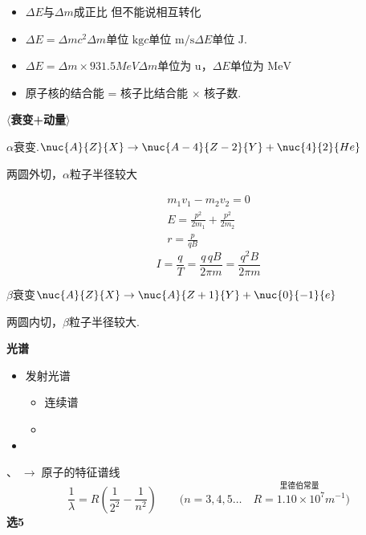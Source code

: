 \begin{itemize}
\item[$\downarrow$] $\Delta E$与$\Delta m$成正比 但不能说相互转化
\item[] $\Delta E=\Delta mc^2$\quad $\Delta m$单位 $\mathrm{kg}$\quad $c$单位 $\mathrm{m/s}$\quad $\Delta E$单位 $\mathrm{J}$.
\item[] $\Delta E=\Delta m\times931.5\unit{MeV}$\quad $\Delta m$单位为 $\mathrm{u}$，$\Delta E$单位为 $\mathrm{MeV}$
\item[] 原子核的结合能 = 核子比结合能 $\times$ 核子数.
\end{itemize}
\textbf{$\langle$衰变+动量$\rangle$} %

\noindent $\alpha$衰变.\quad $\nuc{A}{Z}{X}\to\nuc{A-4}{Z-2}{Y}+\nuc{4}{2}{He}$\quad {} %

两圆外切，$\alpha$粒子半径较大

\begin{gather*}
m_1v_1-m_2v_2=0\\
E=\frac{p^2}{2m_1}+\frac{p^2}{2m_2}\\
r=\frac{p}{qB}
\end{gather*}
\[
I=\frac{q}{T}=\frac{q\,qB}{2\pi m}=\frac{q^2B}{2\pi m}
\]

\noindent $\beta$衰变\quad $\nuc{A}{Z}{X}\to\nuc{A}{Z+1}{Y}+\nuc{0}{-1}{e}$\quad {} %

两圆内切，$\beta$粒子半径较大.

\textbf{光谱}
\begin{itemize}
\item 发射光谱
  \begin{itemize}
  \item 连续谱
  \item {}
  \end{itemize}
\item {}
\end{itemize}
\noindent {}、$\;\to\;$原子的特征谱线 %
\[
\frac{1}{\lambda}=R\left(\frac{1}{2^2}-\frac{1}{n^2}\right)\qquad\bigl(n=3,4,5\ldots\quad \overset{\text{里德伯常量}}{R=1.10\times10^{7}\unit{m^{-1}}}\bigr)
\] %
\textbf{选5} %

